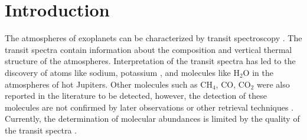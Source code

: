 \documentclass[twocolumn]{aastex61}
\begin{document}



\section{Introduction} \label{sec:intro}
The atmospheres of exoplanets can be characterized by transit spectroscopy \citep[e.g.,][]{Seager00,Hubbard01}. The transit spectra contain information about the composition and vertical thermal structure of the atmospheres. Interpretation of the transit spectra has led to the discovery of atoms like sodium, potassium \citep{Charbonneau02,Redfield08,Jensen11,Sing12,Sing15,Nikolov14,Wilson15}, and molecules like H$_2$O \citep{Deming13,Huitson13,Mandell13,Crouzet14, McCullough14,Wakeford13,Wakeford17,Kreidberg14b,Kreidberg15,Evans16,Line16} in the atmospheres of hot Jupiters. Other molecules such as CH$_4$, CO, CO$_2$ were also reported in the literature to be detected, however, the detection of these molecules are not confirmed by later observations or other retrieval techniques \citep[e.g.,][]{Gibson11,Hansen14,Line14}. Currently, the determination of molecular abundances is limited by the quality of the transit spectra \citep{Burrow14}. 
\end{document}
